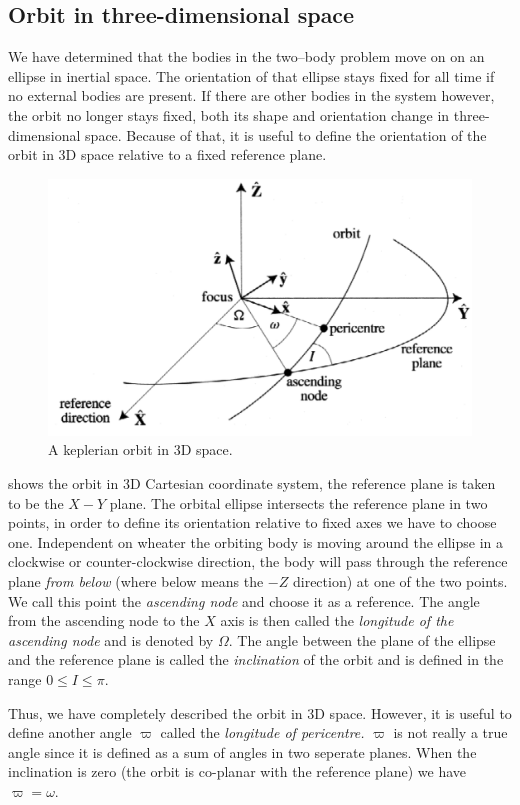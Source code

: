 \documentclass[ twoside,openright,titlepage,numbers=noenddot,headinclude,%
                footinclude=true,cleardoublepage=empty,abstractoff, %
                BCOR=5mm,paper=a4,fontsize=11pt,%
                american,%
                ]{scrreprt}
\begin{document}
\subsection{Orbit in three-dimensional space}
We have determined that the bodies in the two--body problem move on
on an ellipse in inertial space. The orientation of that ellipse 
stays fixed for all time if no external bodies are present. If there 
are other bodies in the system however, the orbit no longer stays
fixed, both its shape and orientation change in three-dimensional space.
Because of that, it is useful to define the orientation of the orbit
in 3D space relative to a fixed reference plane.
\begin{figure}[htb]
\centering
\includegraphics[width=0.8\linewidth]{gfx/3d_orbit.png}
\caption{A keplerian orbit in 3D space.}
\label{fig:3d_orbit}
\end{figure}
 shows the orbit in 3D Cartesian coordinate system,
the reference plane is taken to be the $X-Y$ plane. The orbital
ellipse intersects the reference plane in two points, in order to define
its orientation relative to fixed axes we have to choose one. Independent
on wheater the orbiting body is moving around the ellipse in a clockwise
or counter-clockwise direction, the body will pass through the reference
plane \emph{from below} (where below means the $-Z$ direction)
at one of the two points. We call this point the \emph{ascending node}
and choose it as a reference. The angle from the ascending node to the
$X$ axis is then called the \emph{longitude of the ascending node} and
is denoted by $\Omega$. The angle between the plane of the ellipse and
the reference plane is called the \emph{inclination} of the orbit and
is defined in the range $0\leq I\leq \pi$.

Thus, we have completely described the orbit in 3D space. However, it is useful to 
define another angle $\varpi$ called the \emph{longitude of pericentre.} 
$\varpi$ is not really a true angle since it is defined as a sum of 
angles in two seperate planes. When the inclination is zero (the orbit
is co-planar with the reference plane) we have $\varpi=\omega$. 
\end{document}
